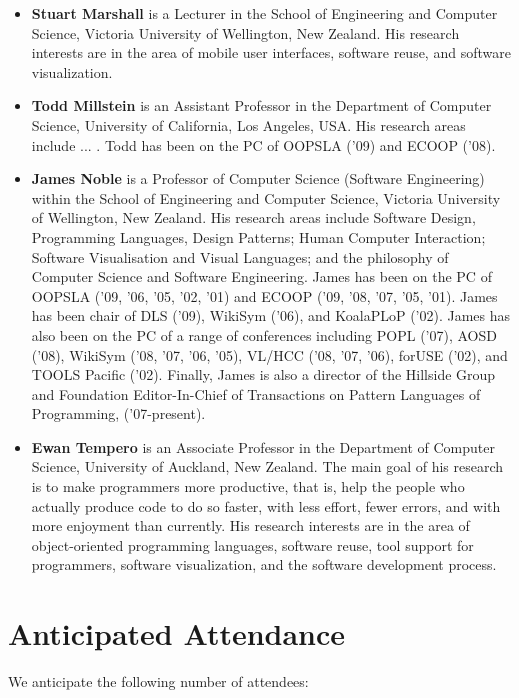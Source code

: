 \documentclass{acm_proc_article-sp}
\begin{document}
\begin{itemize}
\item \textbf{Stuart Marshall} is a Lecturer in the School of Engineering and Computer Science, Victoria University of Wellington, New Zealand. His research interests are in the area of mobile user interfaces, software reuse, and software visualization.

\item \textbf{Todd Millstein} is an Assistant Professor in the Department of Computer Science, University of California, Los Angeles, USA. His research areas include ... . Todd has been on the PC of OOPSLA ('09) and ECOOP ('08).

\item \textbf{James Noble} is a Professor of Computer Science (Software Engineering) within the School of 
Engineering and Computer Science, Victoria University of Wellington, New Zealand. 
His research areas include Software Design, Programming Languages, Design Patterns; 
Human Computer Interaction; Software Visualisation and Visual Languages; and the philosophy of Computer Science and Software Engineering. James has been on the PC of OOPSLA ('09, '06, '05, '02, '01) and ECOOP ('09, '08, '07, '05, '01). James has been chair of DLS ('09), WikiSym ('06), and KoalaPLoP ('02). James has also been on the PC of a range of conferences including POPL ('07), AOSD ('08), WikiSym ('08, '07, '06, '05), VL/HCC ('08, '07, '06), forUSE ('02), and TOOLS Pacific ('02). Finally, James is also a director of the Hillside Group and Foundation Editor-In-Chief of Transactions on Pattern Languages of Programming, ('07-present).

\item \textbf{Ewan Tempero} is an Associate Professor in the Department of Computer Science, University of Auckland, New Zealand. The main goal of his research is to make programmers more productive, that is, help the people who actually produce code to do so faster, with less effort, fewer errors, and with more enjoyment than currently. His research interests are in the area of object-oriented programming languages, software reuse, tool support for programmers, software visualization, and the software development process.

\end{itemize}

\section{Anticipated Attendance}

We anticipate the following number of attendees:
\end{document}
